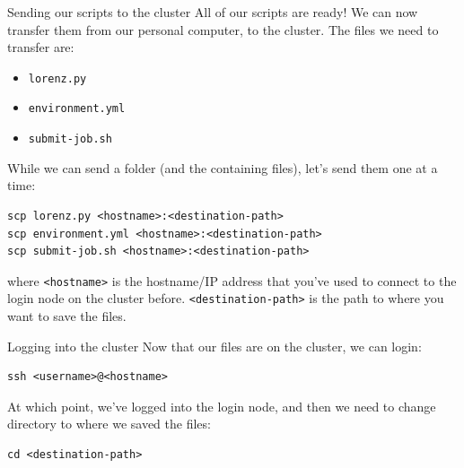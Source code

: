 \documentclass[10pt]{beamer}
\begin{document}
\begin{frame}[label={sec:orge50e6e6},fragile]{Sending our scripts to the cluster}
 All of our scripts are ready! We can now transfer them from our personal
computer, to the cluster. The files we need to transfer are:

\begin{itemize}
\item \texttt{lorenz.py}
\item \texttt{environment.yml}
\item \texttt{submit-job.sh}
\end{itemize}

While we can send a folder (and the containing files), let's send them one at a time:

\begin{verbatim}
scp lorenz.py <hostname>:<destination-path>
scp environment.yml <hostname>:<destination-path>
scp submit-job.sh <hostname>:<destination-path>
\end{verbatim}

where \texttt{<hostname>} is the hostname/IP address that you've used to connect to the
login node on the cluster before. \texttt{<destination-path>} is the path to where you
want to save the files.
\end{frame}

\begin{frame}[label={sec:org55a19d2},fragile]{Logging into the cluster}
 Now that our files are on the cluster, we can login:

\begin{verbatim}
ssh <username>@<hostname>
\end{verbatim}

At which point, we've logged into the login node, and then we need to change
directory to where we saved the files:

\begin{verbatim}
cd <destination-path>
\end{verbatim}
\end{frame}
\end{document}

